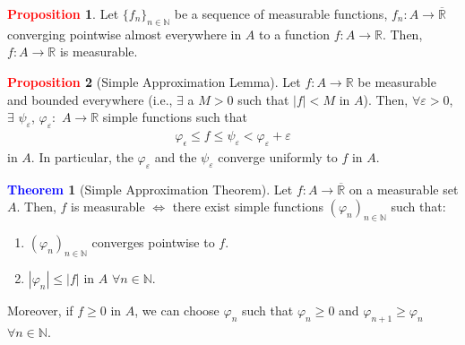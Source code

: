 \documentclass[11pt]{article}
\theoremstyle{definition}
\newcommand{\bb}[1]{\mathbb{#1}}
\newtheorem{theorem}{\textcolor{blue}{Theorem}}
\theoremstyle{definition}
\newtheorem{prop}{\textcolor{red}{Proposition}}
\theoremstyle{remark}
\begin{document}
\begin{prop}
	Let $\{ f_n \}_{n \in \bb{N}}$ be a sequence of measurable functions, $f_n: A \rightarrow \overline{\bb{R}}$ converging pointwise almost everywhere in $A$ to a function $f: A \rightarrow \bb{R}$. Then, $f: A \rightarrow \bb{R}$ is measurable. 
\end{prop}

\begin{prop}[Simple Approximation Lemma]
	Let $f: A \rightarrow \bb{R}$ be measurable and bounded everywhere (i.e., $\exists$ a $M > 0$ such that $|f| < M $ in $A$). Then, $\forall \varepsilon > 0$, $\exists$ $\psi_\varepsilon$, $\varphi_\varepsilon:$ $A \rightarrow \bb{R}$ simple functions such that
	\begin{align*}
		\varphi_\epsilon \leq f \leq \psi_\varepsilon < \varphi_\varepsilon + \varepsilon	
	\end{align*}
	in $A$. In particular, the $\varphi_\varepsilon$ and the $\psi_\varepsilon$ converge uniformly to $f$ in $A$. 
\end{prop}

\begin{theorem}[Simple Approximation Theorem]
	Let $f: A \rightarrow \overline{\bb{R}}$ on a measurable set $A$. Then, $f$ is measurable $\iff$ there exist simple functions $(\varphi_n)_{n \in \bb{N}}$ such that: 
	\begin{enumerate}[noitemsep]
		\item $(\varphi_n)_{n \in \bb{N}}$ converges pointwise to $f$. 
		\item $|\varphi_n| \leq |f|$ in $A$ $\forall n \in \bb{N}$. 
	\end{enumerate}
	Moreover, if $f \geq 0$ in $A$, we can choose $\varphi_n$ such that $\varphi_n \geq 0$ and $\varphi_{n +1} \geq \varphi_n$ $\forall n \in \bb{N}$. 
\end{theorem}
\end{document}
